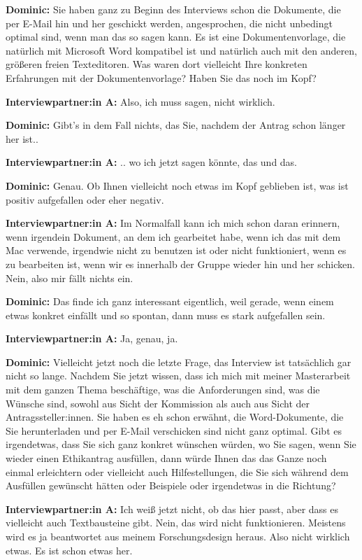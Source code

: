 \documentclass[a4paper,12pt,twoside]{scrreprt}
\begin{document}
\textbf{Dominic:} Sie haben ganz zu Beginn des Interviews schon die Dokumente, die per E-Mail hin und her geschickt werden, angesprochen, die nicht unbedingt optimal sind, wenn man das so sagen kann. Es ist eine Dokumentenvorlage, die natürlich mit Microsoft Word kompatibel ist und natürlich auch mit den anderen, größeren freien Texteditoren. Was waren dort vielleicht Ihre konkreten Erfahrungen mit der Dokumentenvorlage? Haben Sie das noch im Kopf?

\textbf{Interviewpartner:in A:} Also, ich muss sagen, nicht wirklich.

\textbf{Dominic:} Gibt’s in dem Fall nichts, das Sie, nachdem der Antrag schon länger her ist..

\textbf{Interviewpartner:in A:} .. wo ich jetzt sagen könnte, das und das.

\textbf{Dominic:} Genau. Ob Ihnen vielleicht noch etwas im Kopf geblieben ist, was ist positiv aufgefallen oder eher negativ.

\textbf{Interviewpartner:in A:} Im Normalfall kann ich mich schon daran erinnern, wenn irgendein Dokument, an dem ich gearbeitet habe, wenn ich das mit dem Mac verwende, irgendwie nicht zu benutzen ist oder nicht funktioniert, wenn es zu bearbeiten ist, wenn wir es innerhalb der Gruppe wieder hin und her schicken. Nein, also mir fällt nichts ein.

\textbf{Dominic:} Das finde ich ganz interessant eigentlich, weil gerade, wenn einem etwas konkret einfällt und so spontan, dann muss es stark aufgefallen sein.

\textbf{Interviewpartner:in A:} Ja, genau, ja.

\textbf{Dominic:} Vielleicht jetzt noch die letzte Frage, das Interview ist tatsächlich gar nicht so lange. Nachdem Sie jetzt wissen, dass ich mich mit meiner Masterarbeit mit dem ganzen Thema beschäftige, was die Anforderungen sind, was die Wünsche sind, sowohl aus Sicht der Kommission als auch aus Sicht der Antragssteller:innen. Sie haben es eh schon erwähnt, die Word-Dokumente, die Sie herunterladen und per E-Mail verschicken sind nicht ganz optimal. Gibt es irgendetwas, dass Sie sich ganz konkret wünschen würden, wo Sie sagen, wenn Sie wieder einen Ethikantrag ausfüllen, dann würde Ihnen das das Ganze noch einmal erleichtern oder vielleicht auch Hilfestellungen, die Sie sich während dem Ausfüllen gewünscht hätten oder Beispiele oder irgendetwas in die Richtung?

\textbf{Interviewpartner:in A:} Ich weiß jetzt nicht, ob das hier passt, aber dass es vielleicht auch Textbausteine gibt. Nein, das wird nicht funktionieren. Meistens wird es ja beantwortet aus meinem Forschungsdesign heraus. Also nicht wirklich etwas. Es ist schon etwas her.
\end{document}
